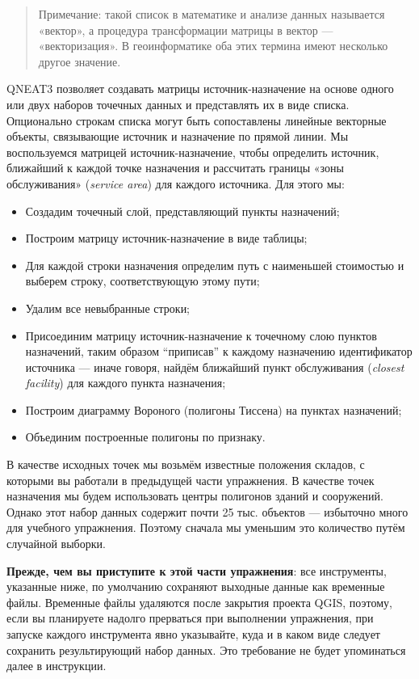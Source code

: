 \documentclass[
  12pt,
]{book}
\providecommand{\tightlist}{%
  \setlength{\itemsep}{0pt}\setlength{\parskip}{0pt}}
\begin{document}
\begin{quote}
Примечание: такой список в математике и анализе данных называется «вектор», а процедура трансформации матрицы в вектор --- «векторизация». В геоинформатике оба этих термина имеют несколько другое значение.
\end{quote}

QNEAT3 позволяет создавать матрицы источник-назначение на основе одного или двух наборов точечных данных и представлять их в виде списка. Опционально строкам списка могут быть сопоставлены линейные векторные объекты, связывающие источник и назначение по прямой линии. Мы воспользуемся матрицей источник-назначение, чтобы определить источник, ближайший к каждой точке назначения и рассчитать границы «зоны обслуживания» (\emph{service area}) для каждого источника. Для этого мы:

\begin{itemize}
\tightlist
\item
  Создадим точечный слой, представляющий пункты назначений;
\item
  Построим матрицу источник-назначение в виде таблицы;
\item
  Для каждой строки назначения определим путь с наименьшей стоимостью и выберем строку, соответствующую этому пути;
\item
  Удалим все невыбранные строки;
\item
  Присоединим матрицу источник-назначение к точечному слою пунктов назначений, таким образом ``приписав'' к каждому назначению идентификатор источника --- иначе говоря, найдём ближайший пункт обслуживания (\emph{closest facility}) для каждого пункта назначения;
\item
  Построим диаграмму Вороного (полигоны Тиссена) на пунктах назначений;
\item
  Объединим построенные полигоны по признаку.
\end{itemize}

В качестве исходных точек мы возьмём известные положения складов, с которыми вы работали в предыдущей части упражнения. В качестве точек назначения мы будем использовать центры полигонов зданий и сооружений. Однако этот набор данных содержит почти 25 тыс. объектов --- избыточно много для учебного упражнения. Поэтому сначала мы уменьшим это количество путём случайной выборки.

\textbf{Прежде, чем вы приступите к этой части упражнения}: все инструменты, указанные ниже, по умолчанию сохраняют выходные данные как временные файлы. Временные файлы удаляются после закрытия проекта QGIS, поэтому, если вы планируете надолго прерваться при выполнении упражнения, при запуске каждого инструмента явно указывайте, куда и в каком виде следует сохранить результирующий набор данных. Это требование не будет упоминаться далее в инструкции.
\end{document}
